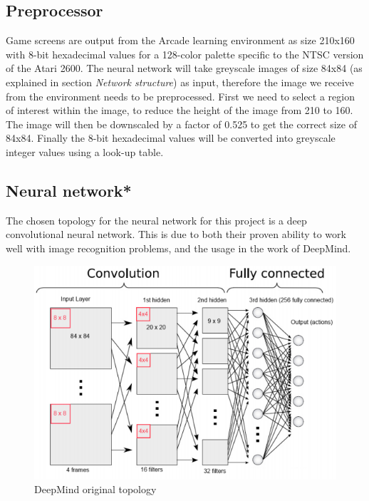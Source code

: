 \documentclass[10pt]{article}
\begin{document}
	\medskip
	
	\subsection{Preprocessor}
		Game screens are output from the Arcade learning environment as size 210x160 with 8-bit hexadecimal values for a 128-color palette specific to the NTSC version of the Atari 2600. The neural network will take greyscale images of size 84x84 (as explained in section \textit{Network structure}) as input, therefore the image we receive from the environment needs to be preprocessed. First we need to select a region of interest within the image, to reduce the height of the image from 210 to 160. The image will then be downscaled by a factor of 0.525 to get the correct size of 84x84. Finally the 8-bit hexadecimal values will be converted into greyscale integer values using a look-up table.
	
	\medskip
	
	\subsection{Neural network*}
		The chosen topology for the neural network for this project is a deep convolutional neural network. This is due to both their proven ability to work well with image recognition problems, and the usage in the work of DeepMind.\\
		
		\begin{figure}[h]				
			\includegraphics[scale=0.7]{img/structure}
			\centering
			\caption{DeepMind original topology \cite{repli}}
			\label{fig:topology13}
		\end{figure}
		
\end{document}

